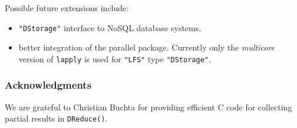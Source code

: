 \documentclass[fleqn]{article}
\newcommand{\pkg}[1]{{\normalfont\fontseries{b}\selectfont #1}}
\let\code=\texttt
\let\proglang=\textsf
\newcommand{\class}[1]{\code{"#1"}}
\begin{document}
Possible future extensions include:
\begin{itemize}
 \item \class{DStorage} interface to NoSQL database systems,
 \item better integration of the \pkg{parallel} package. Currently
   only the \emph{multicore} version of \code{lapply} is used for
   \code{"LFS"} type \class{DStorage}.
 \end{itemize}

\subsubsection*{Acknowledgments}

We are grateful to Christian Buchta for providing efficient
\proglang{C} code for collecting partial results in \code{DReduce()}.

{\small
  
  
}
\end{document}
